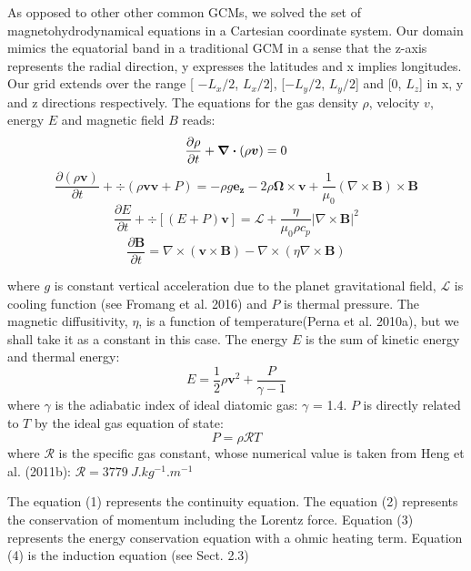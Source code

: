 \documentclass[11pt]{article}
\begin{document}
As opposed to other other common GCMs, we solved the set of magnetohydrodynamical equations in a Cartesian coordinate system. Our domain mimics the equatorial band in a traditional GCM in a  sense that the z-axis represents the radial direction, y expresses the latitudes and x implies longitudes. 
Our grid extends over the range [ $-L_x/2$, $L_x/2$], [$-L_y/2$, $L_y/2$] and [0, $L_z$] in x, y and z directions respectively.
The equations for the gas density $\rho$, velocity $v$, energy $E$ and magnetic field $B$ reads: 
\begin{equation} 
\frac{\partial \rho}{\partial t} + \div (\rho\bm{v})  = 0 \\
\end{equation}
\begin{equation}
\frac{\partial (\rho \bm{v})}{\partial t} + \div (\rho\bm{v}\bm{v} + P)  = -\rho g \bm{e_z} - 2\rho \bm{\Omega} \times \bm{v} + \frac{1}{\mu_0}(\nabla \times \bm{B}) \times \bm{B}
\end{equation}
\begin{equation}
\frac{\partial E}{\partial t} + \div [(E+P)\bm{v} ]  = \mathcal{L} + \frac{\eta}{\mu_0\rho c_p} \vert \nabla \times \bm{B} \vert^2 
\end{equation}
\begin{equation}
\frac{\partial \bm{B}}{\partial t}  = \nabla \times (\bm{v} \times \bm{B}) - \nabla \times (\eta\nabla \times \bm{B}) 
\end{equation}
 


where $g$ is constant vertical acceleration due to the planet gravitational field, $\bm{\mathcal{L}}$ is cooling function (see Fromang et al. 2016) and $P$ is thermal pressure. The magnetic diffusitivity, $\eta$, is a function of temperature(Perna et al. 2010a), but we shall take it as a constant in this case. The energy $E$ is the sum of kinetic energy and thermal energy:
$$ E = \frac{1}{2}\rho \bm{v}^2 + \frac{P}{\gamma -1}$$ 
where $\gamma$ is the adiabatic index of ideal diatomic gas: $\gamma$  = 1.4.  $P$ is directly related to $T$ by the ideal gas equation of state: 
$$ P = \rho \mathcal{R}T$$
where $\mathcal{R}$ is the specific gas constant, whose numerical value is taken from Heng et al. (2011b): $\mathcal{R} = 3779 \ J.kg^{-1}.m^{-1} $

The equation (1) represents the continuity equation. The equation (2) represents the conservation of momentum including the Lorentz force.  Equation (3) represents the energy conservation equation with a ohmic heating term. Equation (4) is the induction equation (see Sect. 2.3)
\end{document}
